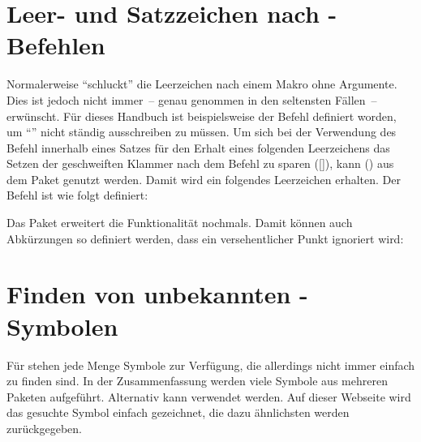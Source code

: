 \section{Leer- und Satzzeichen nach -Befehlen}%
%
%
%
Normalerweise \enquote{schluckt}  die Leerzeichen nach einem 
Makro ohne Argumente. Dies ist jedoch nicht immer~-- genau genommen in den 
seltensten Fällen~-- erwünscht. Für dieses Handbuch ist beispielsweise der 
Befehl  definiert worden, um \enquote{\TUD{}} nicht ständig 
ausschreiben zu müssen. Um sich bei der Verwendung des Befehl innerhalb eines 
Satzes für den Erhalt eines folgenden Leerzeichens das Setzen der geschweiften 
Klammer nach dem Befehl zu sparen ([\PParameter{}]), kann 
() aus dem Paket  genutzt werden. 
Damit wird ein folgendes Leerzeichen erhalten. Der Befehl  ist wie 
folgt definiert:
%
\begin{quoting}
\begin{Code}
\newcommand*{\TUD}{Technische Universit\"at Dresden\xspace}
\end{Code}
\end{quoting}
%
Das Paket  erweitert die Funktionalität nochmals. Damit 
können auch Abkürzungen so definiert werden, dass ein versehentlicher Punkt 
ignoriert wird:
%
\begin{quoting}
\begin{Code}
\newcommand*{\zB}{z.\,B\xperiod}
\end{Code}
\end{quoting}



\section{Finden von unbekannten -Symbolen}
%
%
Für  stehen jede Menge Symbole zur Verfügung, die allerdings 
nicht immer einfach zu finden sind. In der Zusammenfassung
%
{}
werden viele Symbole aus mehreren Paketen aufgeführt. Alternativ kann 
 verwendet werden. 
Auf dieser Webseite wird das gesuchte Symbol einfach gezeichnet, die dazu 
ähnlichsten werden zurückgegeben.



